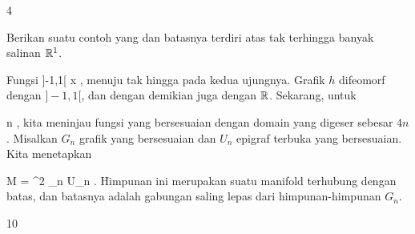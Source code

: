 {4}

{

Berikan suatu contoh
yang
dan batasnya terdiri atas
 {} {}
tak terhingga banyak salinan ${\mathbb R}^1$.

}
{

Fungsi
 {]-1,1[ } { \R
} { x } { {  }
} {,}
menuju tak hingga pada kedua ujungnya. Grafik $h$ difeomorf dengan $]-1,1[$, dan dengan demikian juga dengan ${\mathbb R}$. Sekarang, untuk

\mavergleichskette
{\vergleichskette
{ n
}
{ \in }{  \Z
}
{  }{
}
{    }{
}
{   }{
}
}
{}{}{}
, kita meninjau fungsi yang bersesuaian dengan domain yang digeser sebesar $4n$
\zusatzklammer {jadi dengan domain
\mathl{]4n-1,4n+1[}{}} {} {.}
Misalkan $G_n$ grafik yang bersesuaian dan $U_n$ epigraf terbuka
\zusatzklammer {!} {} {}
yang bersesuaian. Kita menetapkan

\mavergleichskettedisp
{\vergleichskette
{ M
}
{ =} { \R^2 \setminus \biguplus_{n \in \Z} U_n
}
{ } {
}
{ } {
}
{ } {
}
}
{}{}{.}
Himpunan ini merupakan suatu manifold terhubung dengan batas, dan batasnya adalah gabungan saling lepas dari himpunan-himpunan $G_n$.

 }



{10}

